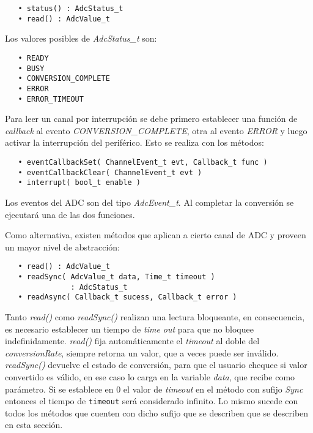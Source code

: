 \begin{verbatim}
   • status() : AdcStatus_t
   • read() : AdcValue_t
\end{verbatim}

Los valores posibles de \emph{AdcStatus\_t} son: 


\begin{verbatim}
   • READY
   • BUSY
   • CONVERSION_COMPLETE
   • ERROR
   • ERROR_TIMEOUT
\end{verbatim}

Para leer un canal por interrupción se debe primero establecer una función de \emph{callback} al evento \emph{CONVERSION\_COMPLETE}, otra al evento \emph{ERROR} y luego activar la interrupción del periférico. Esto se realiza con los métodos:

\begin{verbatim}
   • eventCallbackSet( ChannelEvent_t evt, Callback_t func )
   • eventCallbackClear( ChannelEvent_t evt )
   • interrupt( bool_t enable )
\end{verbatim}

Los eventos del ADC son del tipo \emph{AdcEvent\_t}. Al completar la conversión se ejecutará una de las dos funciones.


Como alternativa, existen métodos que aplican a cierto canal de ADC y proveen un mayor nivel de abstracción:

\begin{verbatim}
   • read() : AdcValue_t
   • readSync( AdcValue_t data, Time_t timeout )
               : AdcStatus_t
   • readAsync( Callback_t sucess, Callback_t error )
\end{verbatim}

Tanto \emph{read()} como \emph{readSync()} realizan una lectura bloqueante, en consecuencia, es necesario establecer un tiempo de \textit{time out} para que no bloquee indefinidamente. \emph{read()} fija automáticamente el \emph{timeout} al doble del \emph{conversionRate}, siempre retorna un valor, que a veces puede ser inválido. \emph{readSync()} devuelve el estado de conversión, para que el usuario chequee si valor convertido es válido, en ese caso lo carga en la variable \emph{data}, que recibe como parámetro. Si se establece en 0 el valor de \emph{timeout} en el método con sufijo \emph{Sync} entonces el tiempo de \texttt{timeout} será considerado infinito. Lo mismo sucede con todos los métodos que cuenten con dicho sufijo que se describen que se describen en esta sección.


